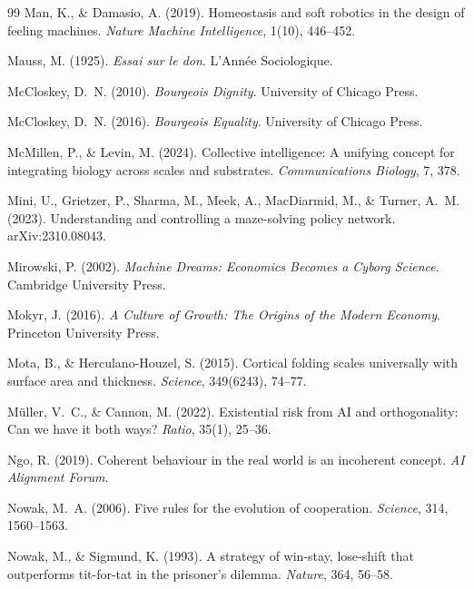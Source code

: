 \documentclass[11pt,twocolumn]{article}
\begin{document}
\begin{thebibliography}{99}
 Man, K., \& Damasio, A. (2019). Homeostasis and soft robotics in the design of feeling machines. \emph{Nature Machine Intelligence}, 1(10), 446--452.

 Mauss, M. (1925). \emph{Essai sur le don}. L'Année Sociologique.

 McCloskey, D.~N. (2010). \emph{Bourgeois Dignity}. University of Chicago Press.

 McCloskey, D.~N. (2016). \emph{Bourgeois Equality}. University of Chicago Press.

 McMillen, P., \& Levin, M. (2024). Collective intelligence: A unifying concept for integrating biology across scales and substrates. \emph{Communications Biology}, 7, 378.

 Mini, U., Grietzer, P., Sharma, M., Meek, A., MacDiarmid, M., \& Turner, A.~M. (2023). Understanding and controlling a maze-solving policy network. arXiv:2310.08043.

 Mirowski, P. (2002). \emph{Machine Dreams: Economics Becomes a Cyborg Science}. Cambridge University Press.

 Mokyr, J. (2016). \emph{A Culture of Growth: The Origins of the Modern Economy}. Princeton University Press.

 Mota, B., \& Herculano-Houzel, S. (2015). Cortical folding scales universally with surface area and thickness. \emph{Science}, 349(6243), 74--77.

 Müller, V.~C., \& Cannon, M. (2022). Existential risk from AI and orthogonality: Can we have it both ways? \emph{Ratio}, 35(1), 25--36.

 Ngo, R. (2019). Coherent behaviour in the real world is an incoherent concept. \emph{AI Alignment Forum}.

 Nowak, M.~A. (2006). Five rules for the evolution of cooperation. \emph{Science}, 314, 1560--1563.

 Nowak, M., \& Sigmund, K. (1993). A strategy of win-stay, lose-shift that outperforms tit-for-tat in the prisoner's dilemma. \emph{Nature}, 364, 56--58.


\end{thebibliography}
\end{document}
